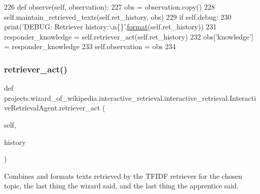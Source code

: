 \begin{DoxyCode}
226     \textcolor{keyword}{def }observe(self, observation):
227         obs = observation.copy()
228         self.maintain\_retrieved\_texts(self.ret\_history, obs)
229         \textcolor{keywordflow}{if} self.debug:
230             print(\textcolor{stringliteral}{'DEBUG: Retriever history:\(\backslash\)n\{\}'}.\hyperlink{namespaceparlai_1_1chat__service_1_1services_1_1messenger_1_1shared__utils_a32e2e2022b824fbaf80c747160b52a76}{format}(self.ret\_history))
231         responder\_knowledge = self.retriever\_act(self.ret\_history)
232         obs[\textcolor{stringliteral}{'knowledge'}] = responder\_knowledge
233         self.observation = obs
234 
\end{DoxyCode}
\mbox{\label{classprojects_1_1wizard__of__wikipedia_1_1interactive__retrieval_1_1interactive__retrieval_1_1InteractiveRetrievalAgent_a7af862aaf2f4a4805e44021fc1b693fa}} 
\subsubsection{\texorpdfstring{retriever\+\_\+act()}{retriever\_act()}}
{\footnotesize\ttfamily def projects.\+wizard\+\_\+of\+\_\+wikipedia.\+interactive\+\_\+retrieval.\+interactive\+\_\+retrieval.\+Interactive\+Retrieval\+Agent.\+retriever\+\_\+act (\begin{DoxyParamCaption}\item[{}]{self,  }\item[{}]{history }\end{DoxyParamCaption})}

\begin{DoxyVerb}Combines and formats texts retrieved by the TFIDF retriever for the chosen
topic, the last thing the wizard said, and the last thing the apprentice said.
\end{DoxyVerb}
 

